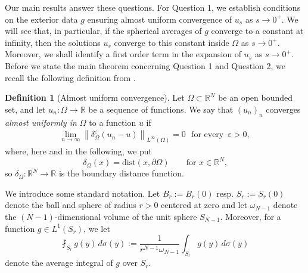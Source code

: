\documentclass[notitlepage,11pt,reqno]{amsart}
\theoremstyle{definition}
\newtheorem{definition}[theorem]{Definition}
\numberwithin{equation}{section}
\newcommand{\RRN}{\mathds{R}^{N}}
\newcommand{\RR}{\mathds{R}}
\begin{document}
Our main results answer these questions. For Question 1, we establish conditions on the exterior data $g$ ensuring almost uniform convergence of $u_s$ as $s \to 0^+$. We will see that, in particular, if the spherical averages of $g$ converge to a constant at infinity, then the solutions $u_s$ converge to this constant inside $\Omega$ as $s \to 0^+$. Moreover, we shall identify a first order term in the expansion of $u_s$ as $s \to 0^+$. Before we state the main theorem concerning Question 1 and Question 2, we recall the following definition from \cite{JSW20}.

\begin{definition}[Almost uniform convergence]
Let $\Omega \subset \RRN$ be an open bounded set, and let $u_n : \Omega \to \RR$ be a sequence of functions. We say that $(u_n)_n$ converges \textit{almost uniformly in $\Omega$} to a function $u$ if 
\begin{align*}\label{almost uniform def}
    \lim_{n \to \infty}\left\|\delta^{\varepsilon}_{\Omega}(u_n-u)\right\|_{L^{\infty}(\Omega)}=0\,\,\,\, \text{for every}\,\,\, \varepsilon >0,
\end{align*}
where, here and in the following, we put
$$
\delta_{\Omega}(x)=\text{dist} (x, \partial \Omega) \qquad \text{for $x \in \RRN$,}
$$
so $\delta_{\Omega}: \RR^N \to \RR$ is the boundary distance function.
\end{definition}

We introduce some standard notation. Let $B_r:= B_r(0)$ resp. $S_r:=S_r(0)$ denote the ball and sphere of radius $r>0$ centered at zero and let $\omega_{N-1}$ denote the $(N-1)$-dimensional volume of the unit sphere $S_{N-1}$. Moreover, for a function $g \in L^1(S_r)$, we let 
$$
\fint_{S_r}g(y)\,d\sigma(y):= \frac{1}{r^{N-1}\omega_{N-1}}\int_{S_r}g(y)\,d\sigma(y)
$$
denote the average integral of $g$ over $S_r$.
\end{document}
